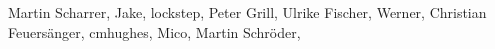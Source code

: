 Martin Scharrer, %
Jake, %
lockstep, %
Peter Grill, %
Ulrike Fischer, %
Werner, %
Christian Feuersänger, %
cmhughes, %
Mico, %
Martin Schröder, %
